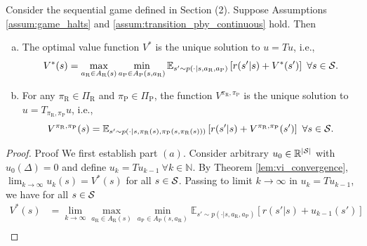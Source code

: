 \documentclass[opre,dblanonrev]{informs4}
\newcommand{\abs}[1]{\left\lvert#1\right\rvert}
\begin{document}
\begin{APPENDICES}
       \begin{proposition}
           \label{lem:bellman_equations}
           Consider the sequential game defined in Section (2). Suppose Assumptions \ref{assum:game_halts} and \ref{assum:transition_pby_continuous} hold. Then
           \begin{enumerate}[(a)]
               \item The optimal value function $V^*$ is the unique solution to $u = Tu$, i.e., 
           \begingroup
           \allowdisplaybreaks
           \begin{equation}
               \label{eqn:bellman_equation}
               V^*(s) = \max_{a_\text{R} \in A_\text{R}(s)}\min_{a_\text{P} \in A_\text{P}(s,a_\text{R})}\mathbb{E}_{s' \sim p(\cdot|s,a_\text{R},a_\text{P})}\left[r(s'|s) + V^*(s')\right] \ \forall s \in {\cal S}.
           \end{equation}
           \endgroup
           \item For any $\pi_\text{R} \in \Pi_\text{R}$ and $\pi_\text{P} \in \Pi_\text{P}$, the function $V^{\pi_\text{R},\pi_\text{P}}$ is the unique solution to $u = T_{\pi_\text{R},\pi_\text{P}}u$, i.e., 
           \begingroup
           \allowdisplaybreaks
           \begin{equation}
           \label{eqn:bellman_eval}
               V^{\pi_\text{R},\pi_\text{P}}(s) =   \mathbb{E}_{s' \sim p(\cdot|s,\pi_\text{R}(s),\pi_\text{P}(s,\pi_\text{R}(s)))}\left[r(s'|s) + V^{\pi_\text{R},\pi_\text{P}}(s')\right] \ \forall s \in {\cal S}.          
           \end{equation}
           \endgroup
           \end{enumerate}
       \end{proposition}
       \begin{proof}{Proof}
           We first establish part $(a)$. Consider arbitrary $u_0 \in \mathbb{R}^{\abs{\cal S}}$ with $u_0(\Delta) = 0$ and define $u_{k} = Tu_{k-1} \ \forall k \in \mathbb{N}$. By Theorem \ref{lem:vi_convergence}, $\lim_{k \to \infty}u_k(s) = V^*(s)$ for all $s \in {\cal S}$. Passing to limit $k \to \infty$ in $u_k = Tu_{k-1}$,  we have for all $s \in {\cal S}$ 
           \begingroup
           \allowdisplaybreaks
           \begin{align}
           \nonumber
           V^*(s) &= \lim_{k\to\infty}\max_{a_\text{R} \in A_\text{R}(s)}\min_{a_\text{P} \in A_\text{P}(s,a_\text{R})}\mathbb{E}_{s' \sim p(\cdot|s,a_\text{R},a_\text{P})}\left[r(s'|s) + u_{k-1}(s')\right]\\

\end{align}
\end{proof}
\end{APPENDICES}
\end{document}
